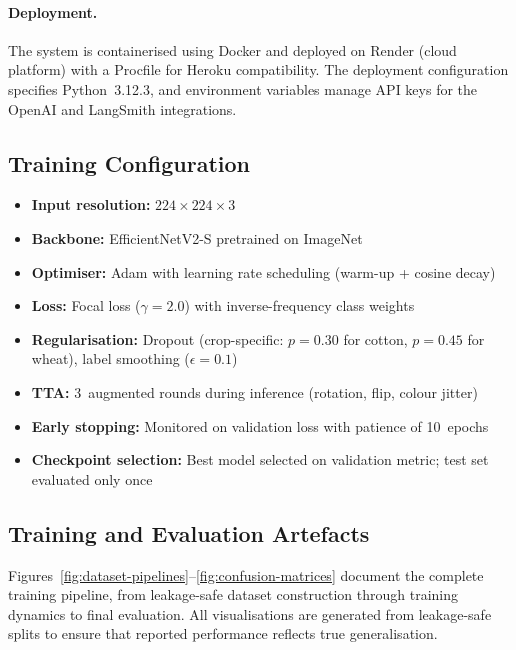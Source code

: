 \documentclass[12pt,a4paper]{report}
\begin{document}
\paragraph{Deployment.}
The system is containerised using Docker and deployed on Render (cloud platform) with a Procfile for Heroku compatibility. The deployment configuration specifies Python~3.12.3, and environment variables manage API keys for the OpenAI and LangSmith integrations.

\subsection{Training Configuration}
\begin{itemize}
    \item \textbf{Input resolution:} $224 \times 224 \times 3$
    \item \textbf{Backbone:} EfficientNetV2-S pretrained on ImageNet
    \item \textbf{Optimiser:} Adam with learning rate scheduling (warm-up + cosine decay)
    \item \textbf{Loss:} Focal loss ($\gamma = 2.0$) with inverse-frequency class weights
    \item \textbf{Regularisation:} Dropout (crop-specific: $p = 0.30$ for cotton, $p = 0.45$ for wheat), label smoothing ($\epsilon = 0.1$)
    \item \textbf{TTA:} 3~augmented rounds during inference (rotation, flip, colour jitter)
    \item \textbf{Early stopping:} Monitored on validation loss with patience of 10~epochs
    \item \textbf{Checkpoint selection:} Best model selected on validation metric; test set evaluated only once
\end{itemize}

\subsection{Training and Evaluation Artefacts}
Figures~\ref{fig:dataset-pipelines}--\ref{fig:confusion-matrices} document the complete training pipeline, from leakage-safe dataset construction through training dynamics to final evaluation. All visualisations are generated from leakage-safe splits to ensure that reported performance reflects true generalisation.
\end{document}
